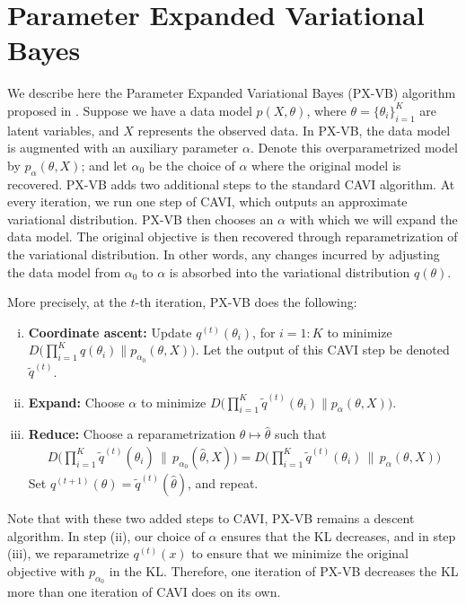 \documentclass{article}
\begin{document}
\newpage

\section{Parameter Expanded Variational Bayes}
\label{PXVB}

We describe here the Parameter Expanded Variational Bayes (PX-VB) algorithm proposed in \cite{Qi}. Suppose we have a data model $p(X,\theta)$, where $\theta =  \{\theta_i\}_{i=1}^K$ are latent variables, and $X$ represents the observed data. In PX-VB, the data model is augmented with an auxiliary parameter $\alpha$. Denote this overparametrized model by $p_\alpha(\theta, X)$; and let $\alpha_0$ be the choice of $\alpha$ where the original model is recovered. PX-VB adds two additional steps to the standard CAVI algorithm. At every iteration, we run one step of CAVI, which outputs an approximate variational distribution. PX-VB then chooses an $\alpha$ with which we will expand the data model. The original objective is then recovered through reparametrization of the variational distribution. In other words, any changes incurred by adjusting the data model from $\alpha_0$ to $\alpha$ is absorbed into the variational distribution $q(\theta)$. 



More precisely, at the $t$-th iteration, PX-VB does the following: 
\begin{enumerate}[(i)]
\item {\bf Coordinate ascent:} Update $q^{(t)}(\theta_i)$, for $i=1:K$ to minimize $D\big( \prod_{i=1}^K q(\theta_i) \| p_{\alpha_0}(\theta, X) \big)$. Let the output of this CAVI step be denoted $\tilde q^{(t)}$. 
\item {\bf Expand:} Choose $\alpha$ to minimize $D\big( \prod_{i=1}^K \tilde q^{(t)}(\theta_i) \| p_\alpha(\theta, X) \big)$.
\item {\bf Reduce:} Choose a reparametrization $\theta \mapsto \hat\theta$ such that
\begin{align*}
D\Big( \prod_{i=1}^K \tilde q^{(t)}(\hat\theta_i) \,\big\|\, p_{\alpha_0}(\hat\theta, X) \Big) = D\Big( \prod_{i=1}^K \tilde q^{(t)}(\theta_i) \,\big\|\, p_\alpha(\theta, X) \Big)
\end{align*}
Set $q^{(t+1)}(\theta) = \tilde q^{(t)}(\hat\theta)$, and repeat. 
\end{enumerate}


Note that with these two added steps to CAVI, PX-VB remains a descent algorithm. In step (ii), our choice of $\alpha$ ensures that the KL decreases, and in step (iii), we reparametrize $q^{(t)}(x)$ to ensure that we minimize the original objective with $p_{\alpha_0}$ in the KL. Therefore, one iteration of PX-VB decreases the KL more than one iteration of CAVI does on its own. 
\end{document}
